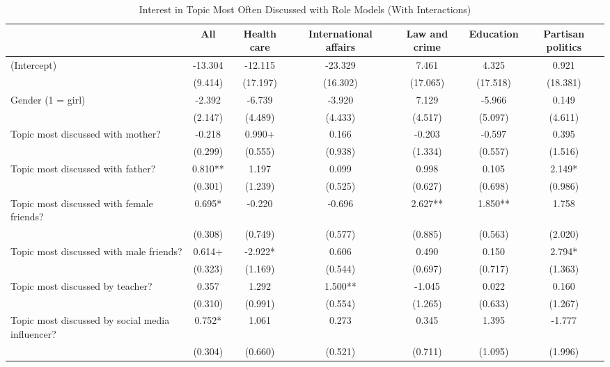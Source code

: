 \documentclass[
  letterpaper,
  DIV=11,
  numbers=noendperiod]{scrreprt}
\begin{document}
\begin{table}
\centering\centering
\caption{Interest in Topic Most Often Discussed with Role Models (With Interactions) \label{tab:lmeAgentsCtrlInterac}}
\centering
\fontsize{6}{8}\selectfont
\begin{tabular}[t]{lcccccc}
\toprule
 & All & Health care & International affairs & Law and crime & Education & Partisan politics\\
\midrule
(Intercept) & -13.304 & -12.115 & -23.329 & 7.461 & 4.325 & 0.921\\
\hspace{1em} & (9.414) & (17.197) & (16.302) & (17.065) & (17.518) & (18.381)\\
Gender (1 = girl) & -2.392 & -6.739 & -3.920 & 7.129 & -5.966 & 0.149\\
\hspace{1em} & (2.147) & (4.489) & (4.433) & (4.517) & (5.097) & (4.611)\\
Topic most discussed with mother? & -0.218 & 0.990+ & 0.166 & -0.203 & -0.597 & 0.395\\
\hspace{1em} & (0.299) & (0.555) & (0.938) & (1.334) & (0.557) & (1.516)\\
Topic most discussed with father? & 0.810** & 1.197 & 0.099 & 0.998 & 0.105 & 2.149*\\
\hspace{1em} & (0.301) & (1.239) & (0.525) & (0.627) & (0.698) & (0.986)\\
Topic most discussed with female friends? & 0.695* & -0.220 & -0.696 & 2.627** & 1.850** & 1.758\\
\hspace{1em} & (0.308) & (0.749) & (0.577) & (0.885) & (0.563) & (2.020)\\
Topic most discussed with male friends? & 0.614+ & -2.922* & 0.606 & 0.490 & 0.150 & 2.794*\\
\hspace{1em} & (0.323) & (1.169) & (0.544) & (0.697) & (0.717) & (1.363)\\
Topic most discussed by teacher? & 0.357 & 1.292 & 1.500** & -1.045 & 0.022 & 0.160\\
\hspace{1em} & (0.310) & (0.991) & (0.554) & (1.265) & (0.633) & (1.267)\\
Topic most discussed by social media influencer? & 0.752* & 1.061 & 0.273 & 0.345 & 1.395 & -1.777\\
\hspace{1em} & (0.304) & (0.660) & (0.521) & (0.711) & (1.095) & (1.996)\\

\end{tabular}
\end{table}
\end{document}
